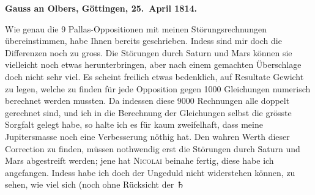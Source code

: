 \documentclass[12pt,a4paper]{article}
\begin{document}
\medskip\noindent
\textbf{Gauss an Olbers, Göttingen, 25.~April 1814.}

Wie genau die 9 Pallas-Oppositionen mit meinen Störungsrechnungen übereinstimmen, habe Ihnen bereits geschrieben. Indess sind mir doch die Differenzen noch zu gross. Die Störungen durch Saturn und Mars können sie vielleicht noch etwas herunterbringen, aber nach einem gemachten Überschlage doch nicht sehr viel. Es scheint freilich etwas bedenklich, auf Resultate Gewicht zu legen, welche zu finden für jede Opposition gegen 1000 Gleichungen numerisch berechnet werden mussten. Da indessen diese 9000 Rechnungen alle doppelt gerechnet sind, und ich in die Berechnung der Gleichungen selbst die grösste Sorgfalt gelegt habe, so halte ich es für kaum zweifelhaft, dass meine Jupitersmasse noch eine Verbesserung nöthig hat. Den wahren Werth dieser Correction zu finden, müssen nothwendig erst die Störungen durch Saturn und Mars abgestreift werden; jene hat \textsc{Nicolai} beinahe fertig, diese habe ich angefangen. Indess habe ich doch der Ungeduld nicht widerstehen können, zu sehen, wie viel sich (noch ohne Rücksicht der $\Saturn$
\end{document}
